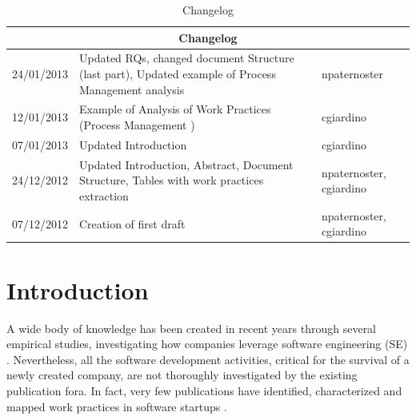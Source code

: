 \documentclass[final,5p,times,twocolumn]{elsarticle}
\begin{document}
\begin{frontmatter}
\begin{keyword}
\end{keyword}


\onecolumn


\onecolumn
\begin{table}[H]
\renewcommand{\arraystretch}{1.1}
\centering
\scriptsize  
\begin{tabular}{|p{0.5in}|p{3.85in}|p{1in}|}
\hline 
\hline  
\multicolumn{3}{|c|}{\textbf{Changelog}} \\
 \hline  
24/01/2013 & Updated RQs, changed document Structure (last part),  Updated example of Process Management analysis & npaternoster \\ 
12/01/2013 & Example of Analysis of Work Practices (Process Management )& cgiardino\\ 
07/01/2013 & Updated Introduction & cgiardino\\ 
24/12/2012 & Updated Introduction,  Abstract, Document Structure, Tables with work practices extraction & npaternoster, cgiardino\\ 
07/12/2012 &  Creation of first draft & npaternoster, cgiardino \\   
\hline \hline 
 \end{tabular}
 \caption{Changelog}
\label{tab:changelog}
\end{table}
\small


\pagebreak
\tableofcontents %
\twocolumn


\end{frontmatter}




\small
\section{Introduction}  %
 \label{sect:intro} 
A wide body of knowledge has been created in recent years through several empirical studies, investigating how companies leverage software engineering (SE) \cite{Kitchenham2009}. Nevertheless, all the software development activities, critical for the survival of a newly created company, are not thoroughly investigated by the existing publication fora. In fact, very few publications have identified, characterized and mapped work practices in software startups \cite{Sutton2000}.
\end{document}
